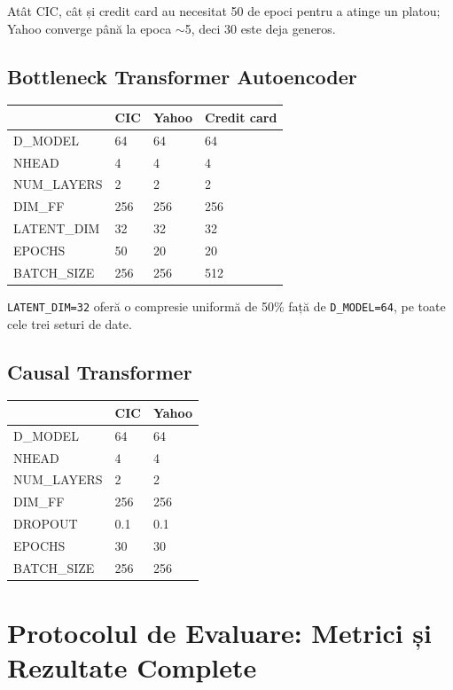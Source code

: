 Atât CIC, cât și credit card au necesitat 50 de epoci pentru a atinge un platou; Yahoo converge până la epoca $\sim$5, deci 30 este deja generos.

\section{Bottleneck Transformer Autoencoder}

\begin{center}
\begin{tabular}{llll}
\toprule
 & CIC & Yahoo & Credit card \\
\midrule
D\_MODEL & 64 & 64 & 64 \\
NHEAD & 4 & 4 & 4 \\
NUM\_LAYERS & 2 & 2 & 2 \\
DIM\_FF & 256 & 256 & 256 \\
LATENT\_DIM & 32 & 32 & 32 \\
EPOCHS & 50 & 20 & 20 \\
BATCH\_SIZE & 256 & 256 & 512 \\
\bottomrule
\end{tabular}
\end{center}

\texttt{LATENT\_DIM=32} oferă o compresie uniformă de 50\% față de \texttt{D\_MODEL=64}, pe toate cele trei seturi de date.

\section{Causal Transformer}

\begin{center}
\begin{tabular}{lll}
\toprule
 & CIC & Yahoo \\
\midrule
D\_MODEL & 64 & 64 \\
NHEAD & 4 & 4 \\
NUM\_LAYERS & 2 & 2 \\
DIM\_FF & 256 & 256 \\
DROPOUT & 0.1 & 0.1 \\
EPOCHS & 30 & 30 \\
BATCH\_SIZE & 256 & 256 \\
\bottomrule
\end{tabular}
\end{center}



\chapter{Protocolul de Evaluare: Metrici și Rezultate Complete}
\label{sec:eval-metrics}


